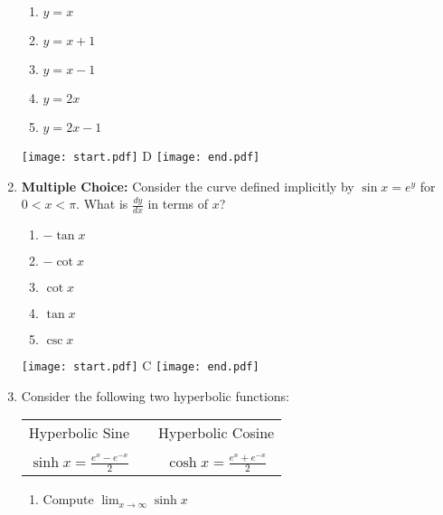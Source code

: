 \documentclass[12pt]{article}
\begin{document}
\begin{enumerate}
\begin{enumerate}
\item $y=x$

\item $y=x+1$

\item $y=x-1$

\item $y=2x$

\item $y=2x-1$

\end{enumerate}

\texttt{[image: start.pdf]}
{{D}}
\texttt{[image: end.pdf]}


\item {\bf Multiple Choice:} Consider the curve defined implicitly by $\sin{x}=e^y$ for $0<x<\pi$. What is $\frac{dy}{dx}$ in terms of $x$?

\begin{enumerate}

\item $-\tan{x}$

\item $-\cot{x}$

\item $\cot{x}$

\item $\tan{x}$

\item $\csc{x}$

\end{enumerate}

\texttt{[image: start.pdf]}
{{C}}
\texttt{[image: end.pdf]}


\item Consider the following two hyperbolic functions:

\smallskip

\begin{center}
\begin{tabular}{ccc}
Hyperbolic Sine & & Hyperbolic Cosine\\
& & \\
$\sinh{x}=\frac{e^x-e^{-x}}{2}$ & \hspace{1 cm} & $\cosh{x}=\frac{e^x+e^{-x}}{2}$
\end{tabular}
\end{center}

\smallskip

\begin{enumerate}

\item Compute $\lim_{x \rightarrow \infty}{\sinh{x}}$


\end{enumerate}
\end{enumerate}
\end{document}
